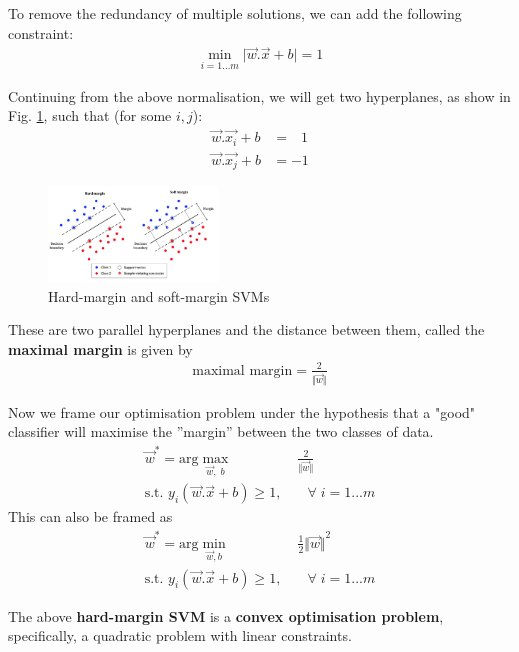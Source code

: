 \documentclass[journal]{IEEEtran}
\begin{document}
To remove the redundancy of multiple solutions, we can add the following constraint:
\begin{align*}
    \min_{i = 1...m} \lvert \vec{w}.\vec{x} + b \rvert = 1
\end{align*}

Continuing from the above normalisation, we will get two hyperplanes, as show in Fig. \ref{fig:margin},  such that (for some $i,j$):
\begin{align*}
    \vec{w}.\vec{x_i} + b &= \;\;\,1 \\
    \vec{w}.\vec{x_j} + b &= -1
\end{align*}

\begin{figure}
    \centering
    \includegraphics[width=0.4\textwidth]{margin.png}
    \caption{Hard-margin and soft-margin SVMs}
    \label{fig:margin}
\end{figure}

These are two parallel hyperplanes and the distance between them, called the \textbf{maximal margin} is given by
\begin{align}
   \text{maximal margin} = \frac{2}{\Vert {\vec{w} \Vert}  }
\end{align}


Now we frame our optimisation problem under the hypothesis that a
"good" classifier will maximise the ”margin” between the two
classes of data.
\begin{align}
    \vec{w}^* = \text{arg}\max_{\vec{w}, \;b}& \; \frac{2}{\Vert {\vec{w} \Vert}  } \\
    \text{s.t. } y_i(\vec{w}.\vec{x} + b) \geq 1, &\quad \forall\; i = 1...m \nonumber
\end{align}
This can also be framed as
\begin{align}
    \vec{w}^* = \text{arg}\min_{\vec{w}, b}&\; \frac{1}{2} \Vert {\vec{w} \Vert}^2 \\
    \text{s.t. } y_i(\vec{w}.\vec{x} + b) \geq 1, &\quad \forall\; i = 1...m \nonumber
\end{align}

The above \textbf{hard-margin SVM} is a \textbf{convex optimisation problem}, specifically,
a quadratic problem with linear constraints.\newline
\end{document}
